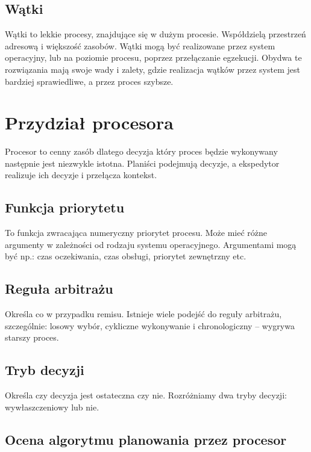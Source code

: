 \documentclass{../notatki}
\begin{document}
\subsection{Wątki}

Wątki to lekkie procesy, znajdujące się w dużym procesie. Współdzielą
przestrzeń adresową i większość zasobów. Wątki mogą być realizowane
przez system operacyjny, lub na poziomie procesu, poprzez
przełączanie egzekucji. Obydwa te rozwiązania mają swoje wady i zalety, gdzie
realizacja wątków przez system jest bardziej sprawiedliwe, a przez
proces szybsze.

\section{Przydział procesora}

Procesor to cenny zasób dlatego decyzja który proces będzie
wykonywany następnie jest niezwykle istotna. Planiści podejmują
decyzje, a ekspedytor realizuje ich decyzje i przełącza kontekst.

\subsection{Funkcja priorytetu}

To funkcja zwracająca numeryczny priorytet procesu. Może mieć różne
argumenty w zależności od rodzaju systemu operacyjnego. Argumentami
mogą być np.: czas oczekiwania, czas obsługi, priorytet zewnętrzny etc.

\subsection{Reguła arbitrażu}

Określa co w przypadku remisu. Istnieje wiele podejść do reguły
arbitrażu, szczególnie: losowy
wybór, cykliczne wykonywanie i chronologiczny – wygrywa starszy proces.

\subsection{Tryb decyzji}

Określa czy decyzja jest ostateczna czy nie. Rozróżniamy dwa tryby
decyzji: wywłaszczeniowy lub nie.

\subsection{Ocena algorytmu planowania przez procesor}
\end{document}
